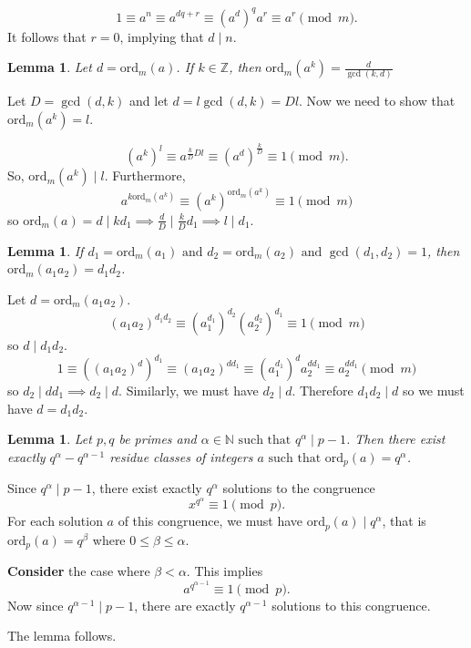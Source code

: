 \documentclass[11pt]{article}
\newtheorem{lemma}[thm]{Lemma}
\theoremstyle{definition}
\newcommand{\ord}[0]{\text{ord}}
\newcommand{\st}[0]{\text{ such that }}
\newcommand{\et}[0]{\text{ and }}
\newcommand{\ZZ}{\mathbb{Z}}
\newcommand{\NN}{\mathbb{N}}
\begin{document}
$$ 1 \equiv a^n \equiv a^{dq+r} \equiv (a^d)^q a^r \equiv a^r \pmod{m}. $$
It follows that $r = 0$, implying that $d\mid n$.
\qedhere

\begin{lemma}
	Let $d = \ord_m(a)$.
	If $k\in\ZZ$, then $\ord_m(a^k) = \frac{d}{\gcd(k,d)}$
\end{lemma}
\proof
Let $D = \gcd(d,k)$ and let $d = l\gcd(d,k) = D l$. 
Now we need to show that $\ord_m(a^k) = l$. 

$$ (a^k)^l \equiv a^{\frac{k}{D} D l} \equiv (a^{d})^{\frac{k}{D}} \equiv 1 \pmod{m} .$$
So, $\ord_m(a^k) \mid l$.
Furthermore, 
$$ a^{k\ord_m(a^k)} \equiv (a^k)^{\ord_m(a^k)} \equiv 1 \pmod{m} $$ 
so $\ord_m(a) = d \mid kd_1 \implies \frac{d}{D} \mid \frac{k}{D} d_1 \implies l \mid d_1$. 
\qedhere


\begin{lemma}
	If $d_1 = \ord_m(a_1) \et d_2 = \ord_m(a_2) \et \gcd(d_1,d_2)=1$, then $\ord_m(a_1a_2) = d_1d_2$. 
\end{lemma}
\proof
	Let $d = \ord_m(a_1a_2)$. 
	$$ (a_1a_2)^{d_1d_2} \equiv (a_1^{d_1})^{d_2} (a_2^{d_2})^{d_1} \equiv 1 \pmod{m} $$
	so $d \mid d_1d_2$. 
	$$ 1 \equiv ((a_1a_2)^d)^{d_1} \equiv (a_1a_2)^{dd_1} \equiv (a_1^{d_1})^d a_2^{dd_1} \equiv a_2^{dd_1} \pmod{m} $$
	so $d_2 \mid dd_1 \implies d_2 \mid d$. 
	Similarly, we must have $d_2 \mid d$. 
	Therefore $d_1d_2 \mid d$ so we must have $d = d_1d_2$.
\qedhere

\begin{lemma}
	Let $p,q$ be primes and $\alpha\in\NN \st q^\alpha \mid p-1$. Then there exist exactly $q^\alpha - q^{\alpha-1}$ residue classes of integers $a \st \ord_p(a) = q^\alpha$. 
\end{lemma}
\proof
	Since $q^\alpha \mid p-1$, there exist exactly $q^\alpha$ solutions to the congruence 
	$$ x^{q^\alpha} \equiv 1 \pmod{p} . $$
	For each solution $a$ of this congruence, we must have $\ord_p(a) \mid q^\alpha$, that is $\ord_p(a) = q^\beta$ where $0\le\beta\le\alpha$.
	
	\textbf{Consider} the case where $\beta<\alpha$. This implies 
	$$ a^{q^{\alpha-1}} \equiv 1 \pmod{p} . $$ 
	Now since $q^{\alpha-1} \mid p-1$, there are exactly $q^{\alpha-1}$ solutions to this congruence.

	The lemma follows.
\qedhere
\end{document}

